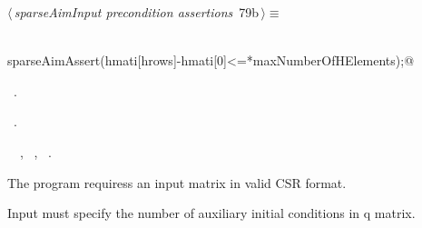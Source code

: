 \documentclass{article}
\begin{document}
\begin{flushleft} \small
\begin{minipage}{\linewidth}\label{scrap126}\raggedright\small
{} $\langle\,${\itshape sparseAimInput precondition assertions}\nobreak\ {\footnotesize {79b}}$\,\rangle\equiv$
\vspace{-1ex}
\begin{list}{}{} \item
\mbox{}\verb@@\\
\mbox{}\verb@  sparseAimAssert(hmati[hrows]-hmati[0]<=*maxNumberOfHElements);@\\
\mbox{}\verb@@{\NWsep}
\end{list}
\vspace{-1.5ex}
\footnotesize
\begin{list}{}{\setlength{\itemsep}{-\parsep}\setlength{\itemindent}{-\leftmargin}}
\item \NWtxtMacroDefBy\ .
\item \NWtxtMacroRefIn\ .
\item \NWtxtIdentsUsed\nobreak\  \verb@hmati@\nobreak\ , \verb@hrows@\nobreak\ , \verb@maxNumberOfHElements@\nobreak\ .
\item{}
\end{list}
\end{minipage}\vspace{4ex}
\end{flushleft}
The program requiress an input matrix in valid CSR format.

Input must specify the number of auxiliary initial conditions in q matrix.
\end{document}
